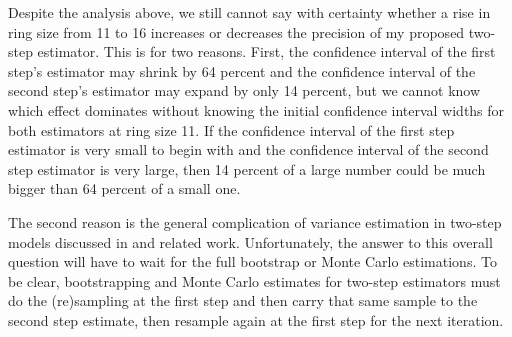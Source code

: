 \documentclass[english]{article}
\begin{document}
Despite the analysis above, we still cannot say with certainty whether
a rise in ring size from 11 to 16 increases or decreases the precision
of my proposed two-step estimator. This is for two reasons. First,
the confidence interval of the first step's estimator may shrink by
64 percent and the confidence interval of the second step's estimator
may expand by only 14 percent, but we cannot know which effect dominates
without knowing the initial confidence interval widths for both estimators
at ring size 11. If the confidence interval of the first step estimator
is very small to begin with and the confidence interval of the second
step estimator is very large, then 14 percent of a large number could
be much bigger than 64 percent of a small one.

The second reason is the general complication of variance estimation
in two-step models discussed in \cite{Murphy1985} and related work.
Unfortunately, the answer to this overall question will have to wait
for the full bootstrap or Monte Carlo estimations. To be clear, bootstrapping
and Monte Carlo estimates for two-step estimators must do the (re)sampling
at the first step and then carry that same sample to the second step
estimate, then resample again at the first step for the next iteration.
\end{document}
